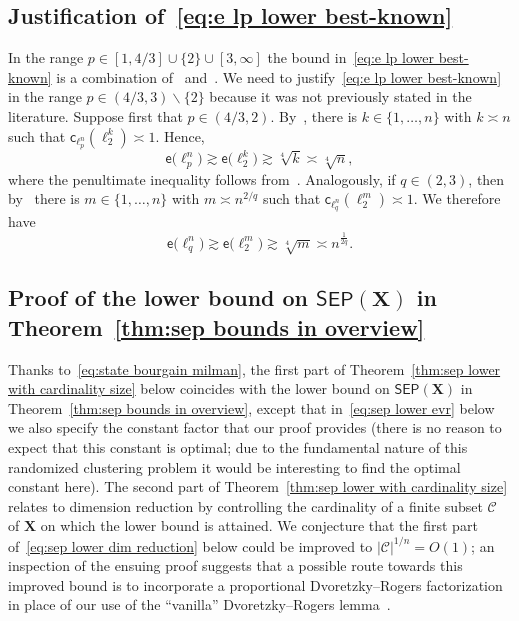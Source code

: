 \documentclass[11pt,reqno]{amsart}
\renewcommand{\setminus}{\smallsetminus}
\newcommand{\cc}{\mathsf{c}}
\newcommand{\X}{\mathbf X}
\theoremstyle{remark}
\newcommand{\N}{\mathbb N}
\newcommand{\ee}{\mathsf{e}}
\newcommand{\sub}{\mathscr{C}}
\renewcommand{\1}{\mathbf 1}
\newcommand{\sep}{\mathsf{SEP}}
\begin{document}
\subsection{Justification of~\eqref{eq:e lp lower best-known}}\label{rem:e ellp lower bounds with FLM}
In the range $p\in [1,4/3]\cup\{2\}\cup[3,\infty]$ the bound in~\eqref{eq:e lp lower best-known} is a combination of~\cite[Corollary~8.12]{BB12} and~\cite[Theorem~1.17]{MN13-bary}. We need to justify~\eqref{eq:e lp lower best-known} in the range $p\in (4/3,3)\setminus \{2\}$ because it was not previously stated in the literature. Suppose first that $p\in (4/3,2)$. By~\cite{FLM77}, there is $k\in \{1,\ldots, n\}$ with $k\asymp n$ such that $\cc_{\ell_p^n}(\ell_2^k)\asymp 1$. Hence, $$\ee\big(\ell_p^n\big)\gtrsim \ee\big(\ell_2^k\big)\gtrsim \sqrt[4]{k}\asymp \sqrt[4]{n},$$ where the penultimate inequality follows from~\cite[Theorem~1.17]{MN13-bary}. Analogously, if $q\in (2,3)$, then by~\cite{FLM77} there is $m\in \{1,\ldots, n\}$ with $m\asymp n^{2/q}$ such that $\cc_{\ell_q^n}(\ell_2^m)\asymp 1$. We therefore have  $$\ee\big(\ell_q^n\big)\gtrsim \ee\big(\ell_2^m\big)\gtrsim \sqrt[4]{m}\asymp n^{\frac{1}{2q}}.$$





\subsection{Proof of the lower bound on $\sep(\X)$ in Theorem~\ref{thm:sep bounds in overview}}\label{sec:proof of vr lower} Thanks to~\eqref{eq:state bourgain milman}, the first part of Theorem~\ref{thm:sep lower with cardinality size} below  coincides with the lower bound on $\sep(\X)$ in Theorem~\ref{thm:sep bounds in overview}, except that in~\eqref{eq:sep lower evr} below we also specify the constant factor that our proof provides (there is no reason to expect that this constant is optimal; due to the fundamental nature of this randomized clustering problem it would be interesting to find the optimal constant here). The second part of Theorem~\ref{thm:sep lower with cardinality size}  relates to dimension reduction by controlling the cardinality of a finite subset $\sub$ of $\X$ on which the lower bound is attained. We conjecture that the first part of~\eqref{eq:sep lower dim reduction} below could be improved to $|\sub|^{1/n}=O(1)$; an inspection of the ensuing proof suggests that a possible route towards this improved bound is to incorporate a proportional Dvoretzky--Rogers factorization~\cite{BS88,ST89,Gia96} in place of our  use of the ``vanilla'' Dvoretzky--Rogers lemma~\cite{DR50}.
\end{document}
